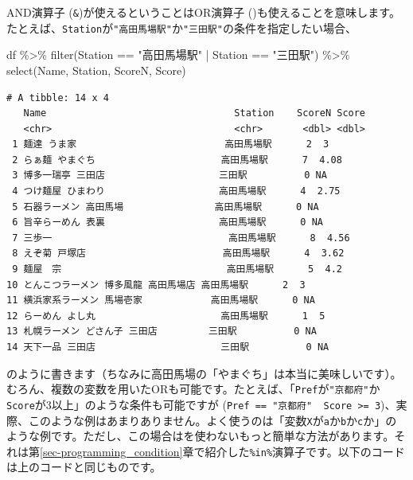 \documentclass[
  a4paper,
  pandoc,
  ja=standard,
  jafont=haranoaji]{bxjsbook}
\newenvironment{Shaded}{\begin{snugshade}}{\end{snugshade}}
\newcommand{\FunctionTok}[1]{\textcolor[rgb]{0.28,0.35,0.67}{#1}}
\newcommand{\NormalTok}[1]{\textcolor[rgb]{0.00,0.48,0.65}{#1}}
\newcommand{\SpecialCharTok}[1]{\textcolor[rgb]{0.37,0.37,0.37}{#1}}
\newcommand{\StringTok}[1]{\textcolor[rgb]{0.13,0.47,0.30}{#1}}
\begin{document}
AND演算子 (\texttt{\&})が使えるということはOR演算子
(\texttt{\textbar{}})も使えることを意味します。たとえば、\texttt{Station}が\texttt{"高田馬場駅"}か\texttt{"三田駅"}の条件を指定したい場合、

\begin{Shaded}
\begin{Highlighting}[numbers=left,,]
\NormalTok{df }\SpecialCharTok{\%\textgreater{}\%} 
  \FunctionTok{filter}\NormalTok{(Station }\SpecialCharTok{==} \StringTok{"高田馬場駅"} \SpecialCharTok{|}\NormalTok{ Station }\SpecialCharTok{==} \StringTok{"三田駅"}\NormalTok{) }\SpecialCharTok{\%\textgreater{}\%}
  \FunctionTok{select}\NormalTok{(Name, Station, ScoreN, Score)}
\end{Highlighting}
\end{Shaded}

\begin{verbatim}
# A tibble: 14 x 4
   Name                                 Station    ScoreN Score
   <chr>                                <chr>       <dbl> <dbl>
 1 麺達 うま家                          高田馬場駅      2  3   
 2 らぁ麺 やまぐち                      高田馬場駅      7  4.08
 3 博多一瑞亭 三田店                    三田駅          0 NA   
 4 つけ麺屋 ひまわり                    高田馬場駅      4  2.75
 5 石器ラーメン 高田馬場                高田馬場駅      0 NA   
 6 旨辛らーめん 表裏                    高田馬場駅      0 NA   
 7 三歩一                               高田馬場駅      8  4.56
 8 えぞ菊 戸塚店                        高田馬場駅      4  3.62
 9 麺屋　宗                             高田馬場駅      5  4.2 
10 とんこつラーメン 博多風龍 高田馬場店 高田馬場駅      2  3   
11 横浜家系ラーメン 馬場壱家            高田馬場駅      0 NA   
12 らーめん よし丸                      高田馬場駅      1  5   
13 札幌ラーメン どさん子 三田店         三田駅          0 NA   
14 天下一品 三田店                      三田駅          0 NA   
\end{verbatim}

のように書きます（ちなみに高田馬場の「やまぐち」は本当に美味しいです）。むろん、複数の変数を用いたORも可能です。たとえば、「\texttt{Pref}が\texttt{"京都府"}か\texttt{Score}が3以上」のような条件も可能ですが
(\texttt{Pref\ ==\ "京都府"\ \textbar{}\ Score\ \textgreater{}=\ 3})、実際、このような例はあまりありません。よく使うのは「変数\texttt{X}が\texttt{a}か\texttt{b}か\texttt{c}か」のような例です。ただし、この場合は\texttt{\textbar{}}を使わないもっと簡単な方法があります。それは第\ref{sec-programming_condition}章で紹介した\texttt{\%in\%}演算子です。以下のコードは上のコードと同じものです。
\end{document}
